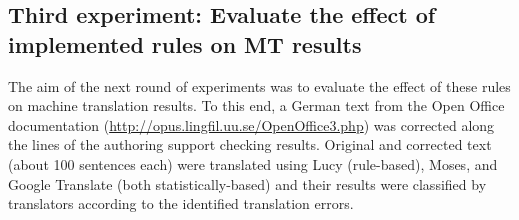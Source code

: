 \documentclass[output=paper]{LSP/langsci}
\begin{document}
\begin{table}
\caption{Classification of errors in \textsc{mt} output of original text compared to text, where pre-editing rules are applied}
\label{tab:siegel:2}
\end{table}

\subsection{Third experiment: Evaluate the effect of implemented rules on MT results}\label{sec:siegel:6.3}

The aim of the next round of experiments was to evaluate the effect of these rules on machine translation results. To this end, a German text from the Open Office documentation (\url{http://opus.lingfil.uu.se/OpenOffice3.php}) was corrected along the lines of the authoring support checking results. Original and corrected text (about 100 sentences each) were translated using Lucy (rule-based), Moses, and Google Translate (both statistically-based) and their results were classified by translators according to the identified translation errors. 
\end{document}
